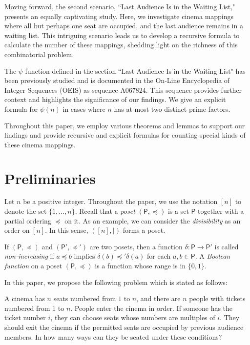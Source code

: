 \documentclass{amsart}
\theoremstyle{definition}
\begin{document}
Moving forward, the second scenario, ``Last Audience Is in the Waiting List," presents an equally captivating study. Here, we investigate cinema mappings where all but perhaps one seat are occupied, and the last audience remains in a waiting list. This intriguing scenario leads us to develop a recursive formula to calculate the number of these mappings, shedding light on the richness of this combinatorial problem. 

The $\psi$ function defined in the section ``Last Audience Is in the Waiting List" has been previously studied and is documented in the On-Line Encyclopedia of Integer Sequences (OEIS) as sequence A067824. This sequence provides further context and highlights the significance of our findings. We give an explicit formula for $\psi(n)$ in cases where $n$ has at most two distinct prime factors.

Throughout this paper, we employ various theorems and lemmas to support our findings and provide recursive and explicit formulas for counting special kinds of these cinema mappings.

\section{Preliminaries}
Let $n$ be a positive integer. Throughout the paper, we use the notation $[n]$ to denote the set $\{1,\ldots,n\}$. Recall that a \textit{poset} $(\mathsf{P},\preceq)$ is a set $\mathsf{P}$ together with a partial ordering $\preceq$ on it. As an example, we can consider the \textit{divisibility} as an order on $[n]$. In this sense, $([n],|)$ forms a poset.

If $(\mathsf{P},\preceq)$ and $(\mathsf{P}',\preceq')$ are two posets, then a function $\delta:\mathsf{P}\to \mathsf{P}'$ is called \textit{non-increasing} if $a\preceq b$ implies $\delta(b)\preceq'\delta(a)$ for each $a,b\in \mathsf{P}$. A \textit{Boolean function} on a poset $(\mathsf{P},\preceq)$ is a function whose range is in $\{0,1\}$. 

In this paper, we propose the following problem which is stated as follows: 

A cinema has $n$ seats numbered from $1$ to $n$, and there are $n$ people with tickets numbered from $1$ to $n$. People enter the cinema in order. If someone has the ticket number $i$, they can choose seats whose numbers are multiples of $i$. They should exit the cinema if the permitted seats are occupied by previous audience members. In how many ways can they be seated under these conditions?
\end{document}
